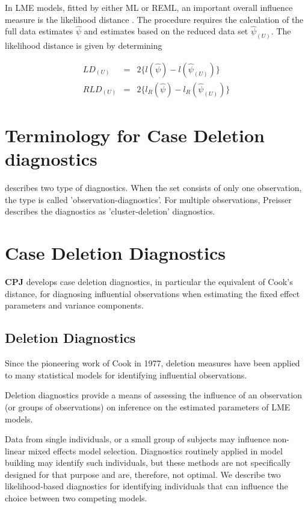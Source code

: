 \documentclass[MAIN.tex]{subfiles}
\begin{document}
	
	
	
	
	
	
	
	In LME models, fitted by either ML or REML, an important overall
	influence measure is the likelihood distance \citep{cook82}. The
	procedure requires the calculation of the full data estimates
	$\hat{\psi}$ and estimates based on the reduced data set
	$\hat{\psi}_{(U)}$. The likelihood distance is given by
	determining
	
	
	\begin{eqnarray}
	LD_{(U)} &=& 2\{l(\hat{\psi}) - l( \hat{\psi}_{(U)}) \}\\
	RLD_{(U)} &=& 2\{l_{R}(\hat{\psi}) - l_{R}(\hat{\psi}_{(U)})\}
	\end{eqnarray}
	

\section{Terminology for Case Deletion diagnostics} %

\citet{preisser} describes two type of diagnostics. When the set
consists of only one observation, the type is called
'observation-diagnostics'. For multiple observations, Preisser
describes the diagnostics as 'cluster-deletion' diagnostics.
	\section{Case Deletion Diagnostics} %
	
	\textbf{CPJ} develops  case deletion diagnostics, in particular the equivalent of  Cook's distance, for diagnosing influential observations when estimating the fixed effect parameters and variance components.
	
	\subsection{Deletion Diagnostics}
	
	Since the pioneering work of Cook in 1977, deletion measures have been applied to many statistical models for identifying influential observations.
	
	Deletion diagnostics provide a means of assessing the influence of an observation (or groups of observations) on inference on the estimated parameters of LME models.
	
	Data from single individuals, or a small group of subjects may influence non-linear mixed effects model selection. Diagnostics routinely applied in model building may identify such individuals, but these methods are not specifically designed for that purpose and are, therefore, not optimal. We describe two likelihood-based diagnostics for identifying individuals that can influence the choice between two competing models.
	
\end{document}
